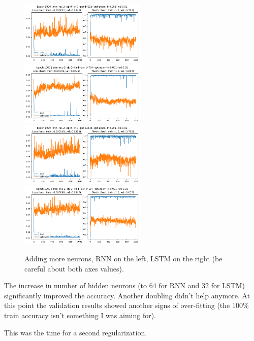 \documentclass[a4paper,10pt]{article}
\begin{document}
\begin{figure}[H]
      \begin{center}
            \includegraphics[width=6cm]{figures/rnn--rec-2--dp-0--lin-1--par-14026--opt-adam--lr-0.001--wd-0.01--e-1000.png}
            \includegraphics[width=6cm]{figures/lstm--rec-2--dp-0--lin-1--par-14794--opt-adam--lr-0.001--wd-0.01--e-1000.png}
            \includegraphics[width=6cm]{figures/rnn--rec-2--dp-0--lin-1--par-52618--opt-adam--lr-0.001--wd-0.01--e-1000.png}
            \includegraphics[width=6cm]{figures/lstm--rec-2--dp-0--lin-1--par-54154--opt-adam--lr-0.001--wd-0.01--e-1000.png}
      \end{center}
      \caption{Adding more neurons, RNN on the left, LSTM on the right (be careful about both axes values).}
      \label{fig7}
\end{figure}

The increase in number of hidden neurons (to 64 for RNN and 32 for LSTM) significantly improved the accuracy. Another doubling didn't help anymore.
At this point the validation results showed another signs of over-fitting (the 100\% train accuracy isn't something I was aiming for).

This was the time for a second regularization.
\end{document}
